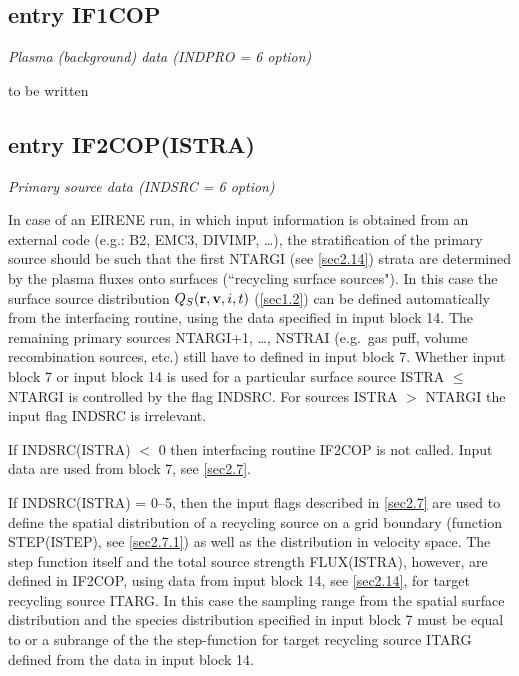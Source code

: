 \subsection{entry IF1COP} \label{sec4.1.1} 

\textsl{Plasma (background) data (INDPRO = 6 option)} 

\medskip 

to be written 

\subsection{entry IF2COP(ISTRA)} \label{sec4.1.2} 

\textsl{Primary source data (INDSRC = 6 option)} 

\medskip 

In case of an EIRENE run, in which input information is obtained from an
external code (e.g.: B2, EMC3, DIVIMP, \dots), the stratification of the
primary source should be such that the first NTARGI (see \cref{sec2.14}) strata
are determined by the plasma fluxes onto surfaces (``recycling surface
sources").
In this case the surface source distribution $Q_S(\mathbf{r},\mathbf{v},i,t)$ (\cref{sec1.2})
can be defined automatically from the interfacing routine, using the data
specified in input block 14.
The remaining primary sources NTARGI+1, \dots, NSTRAI (e.g.\ gas puff, volume
recombination sources, etc.) still have to defined in input block 7.
Whether input block 7 or input block 14 is used for a particular surface source
ISTRA $\le$ NTARGI is controlled by the flag INDSRC.
For sources ISTRA $>$ NTARGI the input flag INDSRC  is irrelevant.

If INDSRC(ISTRA) $<$ 0 then interfacing routine IF2COP is not called.
Input data are used from block 7, see \cref{sec2.7}.

\medskip

If INDSRC(ISTRA) = 0--5, then the input flags described in \cref{sec2.7} are
used to define the spatial distribution of a recycling source on a grid
boundary (function STEP(ISTEP), see \cref{sec2.7.1}) as well as the
distribution in velocity space.
The step function itself and the total source strength FLUX(ISTRA), however,
are defined in IF2COP, using data from input block 14, see \cref{sec2.14}, for
target recycling source ITARG.
In this case the sampling range from the spatial surface distribution and the
species distribution specified in input block 7 must be equal to or a subrange
of the the step-function for target recycling source ITARG defined from the
data in input block 14.

